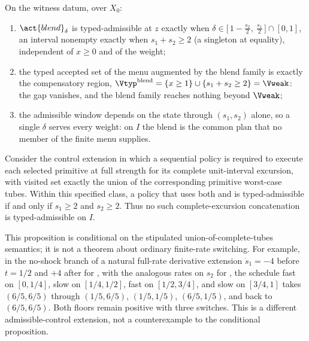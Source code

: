 \begin{theorem}\label{thm:blend}
On the witness datum, over $X_0$:
\begin{enumerate}[label=\textup{(\roman*)},leftmargin=2em]
\item $\act{blend}_\delta$ is typed-admissible at $z$ exactly when $\delta\in\big[\,1-\tfrac{s_2}2,\ \tfrac{s_1}2\,\big]\cap[0,1]$, an interval nonempty exactly when $s_1+s_2\ge2$ (a singleton at equality), independent of $x\ge0$ and of the weight;
\item the typed accepted set of the menu augmented by the blend family is exactly the compensatory region,
$\Vtyp^{\mathrm{blend}}=\{x\ge1\}\cup\{s_1+s_2\ge2\}=\Vweak$: the gap vanishes, and the blend family reaches nothing beyond $\Vweak$;
\item the admissible window depends on the state through $(s_1,s_2)$ alone, so a single $\delta$ serves every weight: on $I$ the blend is the common plan that no member of the finite menu supplies.
\end{enumerate}
\end{theorem}

\begin{proposition}\label{prop:timeshare}
Consider the control extension in which a sequential policy is required to execute each selected primitive at full strength for its complete unit-interval excursion, with visited set exactly the union of the corresponding primitive worst-case tubes. Within this specified class, a policy that uses both  and  is typed-admissible if and only if $s_1\ge2$ and $s_2\ge2$. Thus no such complete-excursion concatenation is typed-admissible on $I$.
\end{proposition}

This proposition is conditional on the stipulated union-of-complete-tubes semantics; it is not a theorem about ordinary finite-rate switching. For example, in the no-shock branch of a natural full-rate derivative extension $\dot s_1=-4$ before $t=1/2$ and $+4$ after for , with the analogous rates on $s_2$ for , the schedule fast on $[0,1/4]$, slow on $[1/4,1/2]$, fast on $[1/2,3/4]$, and slow on $[3/4,1]$ takes $(6/5,6/5)$ through $(1/5,6/5)$, $(1/5,1/5)$, $(6/5,1/5)$, and back to $(6/5,6/5)$. Both floors remain positive with three switches. This is a different admissible-control extension, not a counterexample to the conditional proposition.


